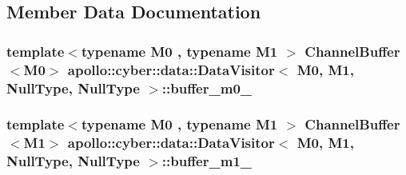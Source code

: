 \subsection{Member Data Documentation}
\hypertarget{classapollo_1_1cyber_1_1data_1_1DataVisitor_3_01M0_00_01M1_00_01NullType_00_01NullType_01_4_a6cabc871c6cf0d49e3d5dbaf6081219c}{
\subsubsection[{buffer\-\_\-m0\-\_\-}]{\setlength{\rightskip}{0pt plus 5cm}template$<$typename M0 , typename M1 $>$ {\bf Channel\-Buffer}$<$M0$>$ {\bf apollo\-::cyber\-::data\-::\-Data\-Visitor}$<$ M0, M1, {\bf Null\-Type}, {\bf Null\-Type} $>$\-::buffer\-\_\-m0\-\_\-\hspace{0.3cm}{\ttfamily [private]}}}\label{classapollo_1_1cyber_1_1data_1_1DataVisitor_3_01M0_00_01M1_00_01NullType_00_01NullType_01_4_a6cabc871c6cf0d49e3d5dbaf6081219c}
\hypertarget{classapollo_1_1cyber_1_1data_1_1DataVisitor_3_01M0_00_01M1_00_01NullType_00_01NullType_01_4_a3a8ba95bb88c577c55e36ab2ac12e552}{
\subsubsection[{buffer\-\_\-m1\-\_\-}]{\setlength{\rightskip}{0pt plus 5cm}template$<$typename M0 , typename M1 $>$ {\bf Channel\-Buffer}$<$M1$>$ {\bf apollo\-::cyber\-::data\-::\-Data\-Visitor}$<$ M0, M1, {\bf Null\-Type}, {\bf Null\-Type} $>$\-::buffer\-\_\-m1\-\_\-\hspace{0.3cm}{\ttfamily [private]}}}\label{classapollo_1_1cyber_1_1data_1_1DataVisitor_3_01M0_00_01M1_00_01NullType_00_01NullType_01_4_a3a8ba95bb88c577c55e36ab2ac12e552}
